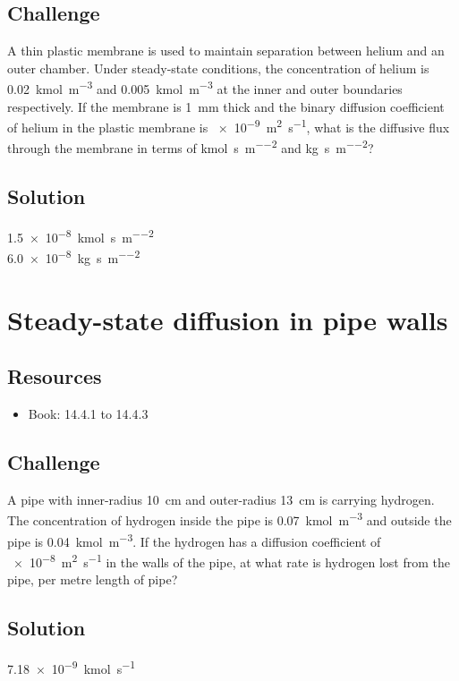 \subsection*{Challenge}
A thin plastic membrane is used to maintain separation between helium and an outer chamber. Under steady-state conditions, the concentration of helium is \SI{0.02}{\kmol\per\cubic\meter} and \SI{0.005}{\kmol\per\cubic\meter} at the inner and outer boundaries respectively. If the membrane is \SI{1}{\mm} thick and the binary diffusion coefficient of helium in the plastic membrane is \SI{e-9}{\square\meter\per\second}, what is the diffusive flux through the membrane in terms of \si{\kmol\per\second\per\square\meter} and \si{\kg\per\second\per\square\meter}?

\subsection*{Solution}
\SI{1.5e-8}{\kmol\per\second\per\square\meter}\\
\SI{6.0e-8}{\kg\per\second\per\square\meter}




\newpage
\section{Steady-state diffusion in pipe walls}

\subsection*{Resources}
\begin{itemize}
    \item Book: 14.4.1 to 14.4.3
\end{itemize}

\subsection*{Challenge}
A pipe with inner-radius \SI{10}{\cm} and outer-radius \SI{13}{\cm} is carrying hydrogen. The concentration of hydrogen inside the pipe is \SI{0.07}{\kmol\per\cubic\meter} and outside the pipe is \SI{0.04}{\kmol\per\cubic\meter}. If the hydrogen has a diffusion coefficient of \SI{e-8}{\square\meter\per\second} in the walls of the pipe, at what rate is hydrogen lost from the pipe, per metre length of pipe?

\subsection*{Solution}
\SI{7.18e-9}{\kmol\per\second}




